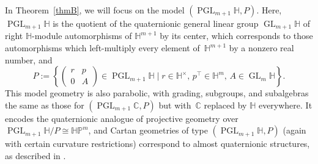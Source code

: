 \documentclass[pdftex]{sigma}
\numberwithin{equation}{section}
\theoremstyle{definition}
\DeclareMathOperator{\GLin}{\mathrm{GL}}
\DeclareMathOperator{\PGL}{\mathrm{PGL}}
\begin{document}
In Theorem~\ref{thmB}, we will focus on the model $(\PGL_{m+1}\mathbb{H},P)$. Here, $\PGL_{m+1}\mathbb{H}$ is the quotient of the quaternionic general linear group $\GLin_{m+1}\mathbb{H}$ of right $\mathbb{H}$-module automorphisms of $\mathbb{H}^{m+1}$ by its center, which corresponds to those automorphisms which left-multiply every element of~$\mathbb{H}^{m+1}$ by a nonzero real number, and \[P:=\left\{\begin{pmatrix}r & p \\ 0 & A\end{pmatrix}\in\PGL_{m+1}\mathbb{H}\mid r\in\mathbb{H}^\times,\, p^\top\in\mathbb{H}^m,\, A\in\GLin_m\mathbb{H}\right\}.\] This model geometry is also parabolic, with grading, subgroups, and subalgebras the same as those for $(\PGL_{m+1}\mathbb{C},P)$ but with~$\mathbb{C}$ replaced by $\mathbb{H}$ everywhere. It encodes the quaternionic analogue of projective geometry over $\PGL_{m+1}\mathbb{H}/P\cong\mathbb{HP}^m$, and Cartan geometries of type $(\PGL_{m+1}\mathbb{H},P)$ (again with certain curvature restrictions) correspond to almost quaternionic structures, as described in \cite[Proposition~4.1.8]{CapSlovakPG1}.
\end{document}
